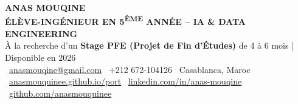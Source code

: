 \documentclass[a4paper,9pt]{extarticle}
\begin{document}
\begin{center}
  {\LARGE \textbf{\color{primary} ANAS MOUQINE}}\\[2pt]
  {\small \textbf{\color{accent} ÉLÈVE-INGÉNIEUR EN 5\textsuperscript{ÈME} ANNÉE -- IA \& DATA ENGINEERING}}\\[2pt]
  {\footnotesize \color{textmuted} À la recherche d'un \textbf{\color{primary}Stage PFE (Projet de Fin d'Études)} de 4 à 6 mois | Disponible en 2026}\\[4pt]

  {\footnotesize \color{textdark}
    \faEnvelope\ \href{mailto:anasmouqine@gmail.com}{anasmouqine@gmail.com} \quad\textbar\quad
    \faPhone*\ +212 672-104126 \quad\textbar\quad
    \faMapMarker*\ Casablanca, Maroc
  }\\[2pt]
  {\footnotesize \color{textdark}
    \faGlobe\ \href{https://anasmouquinee.github.io/port/}{anasmouquinee.github.io/port} \quad\textbar\quad
    \faLinkedin\ \href{https://www.linkedin.com/in/anas-mouqine-329207304/}{linkedin.com/in/anas-mouqine} \quad\textbar\quad
    \faGithub\ \href{https://github.com/anasmouquinee}{github.com/anasmouquinee}
  }
\end{center}

\vspace{-4pt}
\noindent{\color{linegray}\rule{\linewidth}{0.8pt}}
\vspace{2pt}
\end{document}
